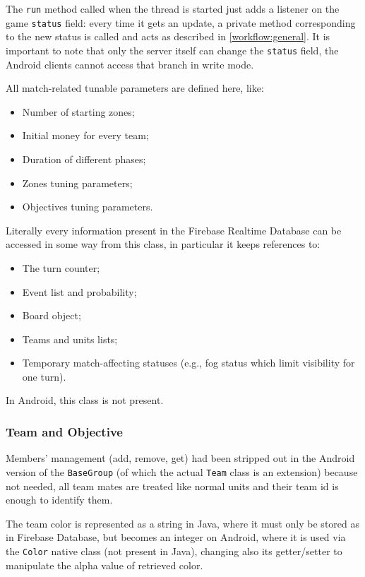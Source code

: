 				The \lstinline|run| method called when the thread is started just adds a listener on the game \lstinline|status| field: every time it gets an update, a private method corresponding to the new status is called and acts as described in \autoref{workflow:general}.
				It is important to note that only the server itself can change the \lstinline|status| field, the Android clients cannot access that branch in write mode.
				
				All match-related tunable parameters are defined here, like:
				\begin{itemize}
					\item Number of starting zones;
					\item Initial money for every team;
					\item Duration of different phases;
					\item Zones tuning parameters;
					\item Objectives tuning parameters.
				\end{itemize}
			
				Literally every information present in the Firebase Realtime Database can be accessed in some way from this class, in particular it keeps references to:
				\begin{itemize}
					\item The turn counter;
					\item Event list and probability;
					\item Board object;
					\item Teams and units lists;
					\item Temporary match-affecting statuses (e.g., fog status which limit visibility for one turn).
				\end{itemize}
			
				In Android, this class is not present.
				
			\subsubsection{Team and Objective}
			
				Members' management (add, remove, get) had been stripped out in the Android version of the \lstinline|BaseGroup| (of which the actual \lstinline|Team| class is an extension) because not needed, all team mates are treated like normal units and their team id is enough to identify them. 
				
				The team color is represented as a string in Java, where it must only be stored as in Firebase Database, but becomes an integer on Android, where it is used via the \lstinline|Color| native class (not present in Java), changing also its getter/setter to manipulate the alpha value of retrieved color.
				
